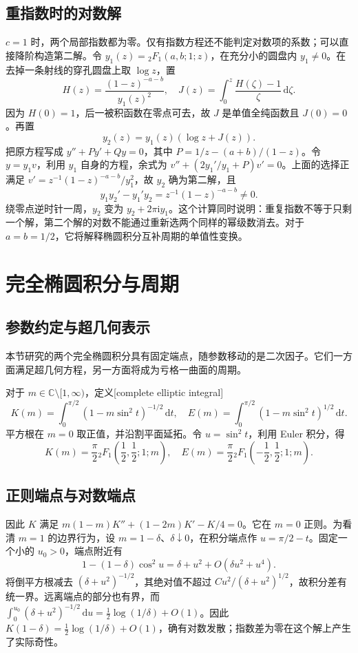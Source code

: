 \subsection{重指数时的对数解}
\label{b3:subsec:F0303}

\(c=1\) 时，两个局部指数都为零。仅有指数方程还不能判定对数项的系数；可以直接降阶构造第二解。令
\(y_1(z)={}_2F_1(a,b;1;z)\)，在充分小的圆盘内 \(y_1\ne0\)。在去掉一条射线的穿孔圆盘上取 \(\log z\)，置
\[
 H(z)=\frac{(1-z)^{-a-b}}{y_1(z)^2},
 \quad
 J(z)=\int_0^z\frac{H(\zeta)-1}{\zeta}\,\mathrm{d}\zeta.
\]
因为 \(H(0)=1\)，后一被积函数在零点可去，故 \(J\) 是单值全纯函数且 \(J(0)=0\)。再置
\[
 y_2(z)=y_1(z)(\log z+J(z)).
\]
把原方程写成 \(y''+P y'+Qy=0\)，其中
\(P=1/z-(a+b)/(1-z)\)。令 \(y=y_1v\)，利用 \(y_1\) 自身的方程，余式为
\(v''+(2y_1'/y_1+P)v'=0\)。上面的选择正满足
\(v'=z^{-1}(1-z)^{-a-b}/y_1^2\)，故 \(y_2\) 确为第二解，且
\[
 y_1y_2'-y_1'y_2=z^{-1}(1-z)^{-a-b}\ne0.
\]
绕零点逆时针一周，\(y_2\) 变为 \(y_2+2\pi\mathrm{i}y_1\)。这个计算同时说明：重复指数不等于只剩一个解，第二个解的对数不能通过重新选两个同样的幂级数消去。对于 \(a=b=1/2\)，它将解释椭圆积分互补周期的单值性变换。

\section{完全椭圆积分与周期}
\label{b3:sec:F04}

\subsection{参数约定与超几何表示}
\label{b3:subsec:F0401}

本节研究的两个完全椭圆积分具有固定端点，随参数移动的是二次因子。它们一方面满足超几何方程，另一方面将成为亏格一曲面的周期。

对于 \(m\in\mathbb C\setminus[1,\infty)\)，定义[complete elliptic integral]
\[
 K(m)=\int_0^{\pi/2}(1-m\sin^2t)^{-1/2}\,\mathrm{d}t,
 \quad E(m)=\int_0^{\pi/2}(1-m\sin^2t)^{1/2}\,\mathrm{d}t.
\]
平方根在 \(m=0\) 取正值，并沿割平面延拓。令 \(u=\sin^2t\)，利用 Euler 积分，得
\[
 K(m)=\frac\pi2{}_2F_1\left(\frac12,\frac12;1;m\right),\quad
 E(m)=\frac\pi2{}_2F_1\left(-\frac12,\frac12;1;m\right).
\]
\subsection{正则端点与对数端点}
\label{b3:subsec:F0402}

因此 \(K\) 满足
\(m(1-m)K''+(1-2m)K'-K/4=0\)。它在 \(m=0\) 正则。为看清 \(m=1\) 的边界行为，设 \(m=1-\delta\)、\(\delta\downarrow0\)，在积分端点作 \(u=\pi/2-t\)。固定一个小的 \(u_0>0\)，端点附近有
\[
1-(1-\delta)\cos^2u=\delta+u^2+O(\delta u^2+u^4).
\]
将倒平方根减去 \((\delta+u^2)^{-1/2}\)，其绝对值不超过 \(Cu^2/(\delta+u^2)^{1/2}\)，故积分差有统一界。远离端点的部分也有界，而
\(\int_0^{u_0}(\delta+u^2)^{-1/2}\,\mathrm{d}u=\tfrac12\log(1/\delta)+O(1)\)。因此
\(K(1-\delta)=\tfrac12\log(1/\delta)+O(1)\)，确有对数发散；指数差为零在这个解上产生了实际奇性。

